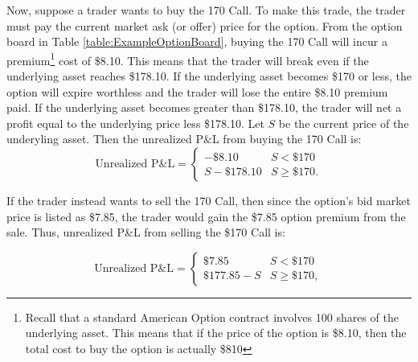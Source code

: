 \documentclass[12pt, a4paper, notitlepage]{article}
\numberwithin{equation}{subsection}
\numberwithin{figure}{subsection}
\numberwithin{table}{subsection}
\newcommand{\newpar}{\newline \newline}
\begin{document}
\newpar
Now, suppose a trader wants to buy the 170 Call.  To make this trade, the trader must pay the current market ask (or offer) price for the option.  From the option board in Table \ref{table:ExampleOptionBoard}, buying the 170 Call will incur a premium\footnote{Recall that a standard American Option contract involves 100 shares of the underlying asset.  This means that if the price of the option is \$8.10, then the total cost to buy the option is actually \$810} cost of \$8.10.  This means that the trader will break even if the underlying asset reaches \$178.10.  If the underlying asset becomes \$170 or less, the option will expire worthless and the trader will lose the entire \$8.10 premium paid.  If the underlying asset becomes greater than \$178.10, the trader will net a profit equal to the underlying price less \$178.10.
\newpar
Let $S$ be the current price of the underyling asset.  Then the unrealized P\&L from buying the 170 Call is:
\begin{equation}
\text{Unrealized P\&L} = 
\begin{cases}
	  -\$8.10 		& S <  \$170 \\
      S - \$178.10 	& S \geq \$170.
\end{cases}
\end{equation}

If the trader instead wants to sell the 170 Call, then since the option's bid market price is listed as \$7.85, the trader would gain the \$7.85 option premium from the sale.  Thus, unrealized P\&L from selling the \$170 Call is:

\begin{equation}
  \text{Unrealized P\&L} = 
  \begin{cases}
        \$7.85 			& S <  \$170 \\
        \$177.85 - S 	& S \geq \$170,
  \end{cases}
\end{equation}
\end{document}
